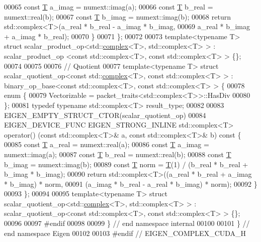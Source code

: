 \begin{DoxyCode}
00065     \textcolor{keyword}{const} \hyperlink{group___sparse_core___module_class_eigen_1_1_triplet}{T} a\_imag = numext::imag(a);
00066     \textcolor{keyword}{const} \hyperlink{group___sparse_core___module_class_eigen_1_1_triplet}{T} b\_real = numext::real(b);
00067     \textcolor{keyword}{const} \hyperlink{group___sparse_core___module_class_eigen_1_1_triplet}{T} b\_imag = numext::imag(b);
00068     \textcolor{keywordflow}{return} std::complex<T>(a\_real * b\_real - a\_imag * b\_imag,
00069                            a\_real * b\_imag + a\_imag * b\_real);
00070   \}
00071 \};
00072 
00073 \textcolor{keyword}{template}<\textcolor{keyword}{typename} T> \textcolor{keyword}{struct }scalar\_product\_op<std::\hyperlink{structcomplex}{complex}<T>, std::complex<T> > : scalar\_product\_op
      <const std::complex<T>, const std::complex<T> > \{\};
00074 
00075 
00076 \textcolor{comment}{// Quotient}
00077 \textcolor{keyword}{template}<\textcolor{keyword}{typename} T> \textcolor{keyword}{struct }scalar\_quotient\_op<const std::\hyperlink{structcomplex}{complex}<T>, const std::complex<T> > : 
      binary\_op\_base<const std::complex<T>, const std::complex<T> > \{
00078   \textcolor{keyword}{enum} \{
00079     Vectorizable = packet\_traits<std::complex<T>>::HasDiv
00080   \};
00081   \textcolor{keyword}{typedef} \textcolor{keyword}{typename} std::complex<T> result\_type;
00082 
00083   EIGEN\_EMPTY\_STRUCT\_CTOR(scalar\_quotient\_op)
00084   EIGEN\_DEVICE\_FUNC EIGEN\_STRONG\_INLINE std::complex<T> operator() (\textcolor{keyword}{const} std::complex<T>& a, \textcolor{keyword}{const} 
      std::complex<T>& b)\textcolor{keyword}{ const }\{
00085     \textcolor{keyword}{const} \hyperlink{group___sparse_core___module_class_eigen_1_1_triplet}{T} a\_real = numext::real(a);
00086     \textcolor{keyword}{const} \hyperlink{group___sparse_core___module_class_eigen_1_1_triplet}{T} a\_imag = numext::imag(a);
00087     \textcolor{keyword}{const} \hyperlink{group___sparse_core___module_class_eigen_1_1_triplet}{T} b\_real = numext::real(b);
00088     \textcolor{keyword}{const} \hyperlink{group___sparse_core___module_class_eigen_1_1_triplet}{T} b\_imag = numext::imag(b);
00089     \textcolor{keyword}{const} \hyperlink{group___sparse_core___module_class_eigen_1_1_triplet}{T} norm = \hyperlink{group___sparse_core___module_class_eigen_1_1_triplet}{T}(1) / (b\_real * b\_real + b\_imag * b\_imag);
00090     \textcolor{keywordflow}{return} std::complex<T>((a\_real * b\_real + a\_imag * b\_imag) * norm,
00091                            (a\_imag * b\_real - a\_real * b\_imag) * norm);
00092   \}
00093 \};
00094 
00095 \textcolor{keyword}{template}<\textcolor{keyword}{typename} T> \textcolor{keyword}{struct }scalar\_quotient\_op<std::\hyperlink{structcomplex}{complex}<T>, std::complex<T> > : 
      scalar\_quotient\_op<const std::complex<T>, const std::complex<T> > \{\};
00096 
00097 \textcolor{preprocessor}{#endif}
00098 
00099 \} \textcolor{comment}{// end namespace internal}
00100 
00101 \} \textcolor{comment}{// end namespace Eigen}
00102 
00103 \textcolor{preprocessor}{#endif // EIGEN\_COMPLEX\_CUDA\_H}
\end{DoxyCode}
